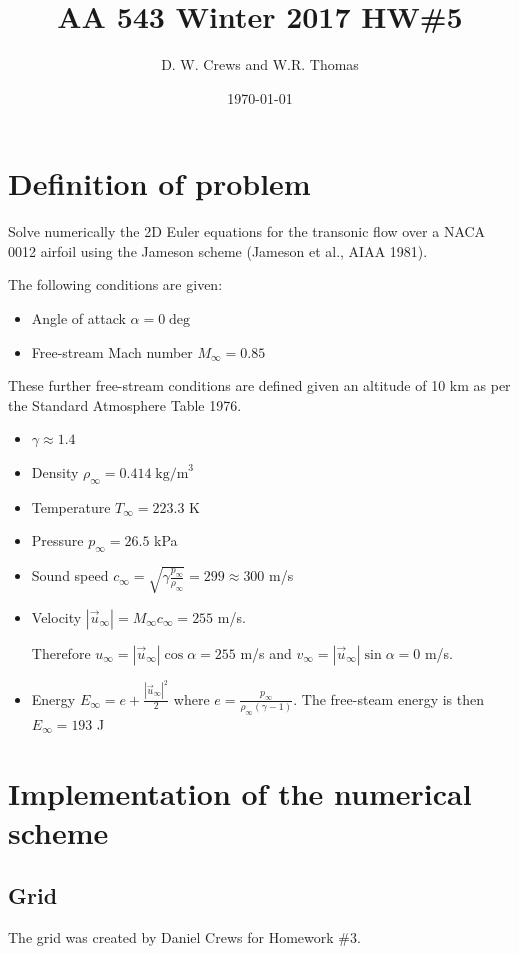 \documentclass[11pt]{article}
\title{AA 543 Winter 2017 HW\#5}
\author{D. W. Crews and W.R. Thomas}
\date{\today}
\begin{document}
\maketitle

\section{Definition of problem}
Solve numerically the 2D Euler equations for the transonic flow over a NACA 0012 airfoil using the Jameson scheme (Jameson et al., AIAA 1981).  

\noindent The following conditions are given:
\begin{itemize}
	\item Angle of attack $\alpha = 0 \deg$
	\item Free-stream Mach number $M_\infty = 0.85$
\end{itemize}

\noindent These further free-stream conditions are defined given an altitude of 10 km as per the Standard Atmosphere Table 1976.
\begin{itemize}
	\item $\gamma \approx 1.4$
	\item Density $\rho_\infty = 0.414 \; \text{kg/m}^3$ 
	\item Temperature $T_\infty = 223.3 $ K
	\item Pressure $p_\infty = 26.5 $ kPa
	\item Sound speed $c_\infty = \sqrt{\gamma \frac{p_\infty}{\rho_\infty}} = 299 \approx 300 $ m/s
	\item Velocity $|\vec{u}_\infty| = M_\infty c_\infty = 255$ m/s. 
	
	Therefore $u_\infty = |\vec{u}_\infty| \cos\alpha = 255$ m/s and  $v_\infty = |\vec{u}_\infty| \sin\alpha = 0$ m/s.
	\item Energy $E_\infty = e + \frac{|\vec{u}_\infty|^2}{2}$ where $e = \frac{p_\infty}{\rho_\infty (\gamma -1)} $. The free-steam energy is then $E_\infty = 193 $ J
\end{itemize}

\section{Implementation of the numerical scheme}
	\subsection{Grid}
	The grid was created by Daniel Crews for Homework \#3.
	
\end{document}
